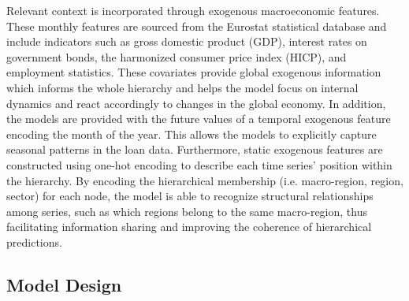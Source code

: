 \documentclass[letterpaper]{article}
\begin{document}
Relevant context is incorporated through exogenous macroeconomic features. 
These monthly features are sourced from the Eurostat statistical database and include indicators such as gross domestic product (GDP), interest rates on government bonds, the harmonized consumer price index (HICP), and employment statistics. 
These covariates provide global exogenous information which informs the whole hierarchy and helps the model focus on internal dynamics and react accordingly to changes in the global economy. 
In addition, the models are provided with the future values of a temporal exogenous feature encoding the month of the year. 
This allows the models to explicitly capture seasonal patterns in the loan data. Furthermore, static exogenous features are constructed using one-hot encoding to describe each time series' position within the hierarchy. 
By encoding the hierarchical membership (i.e. macro-region, region, sector) for each node, the model is able to recognize structural relationships among series, such as which regions belong to the same macro-region, thus facilitating information sharing and improving the coherence of hierarchical predictions.

\subsection{Model Design}
\end{document}
